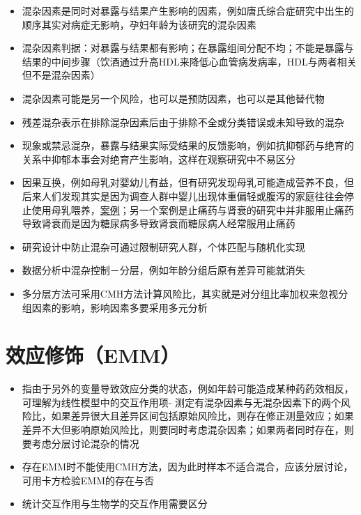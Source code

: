 \documentclass[]{book}
\providecommand{\tightlist}{%
  \setlength{\itemsep}{0pt}\setlength{\parskip}{0pt}}
\begin{document}
\begin{itemize}
\tightlist
\item
  混杂因素是同时对暴露与结果产生影响的因素，例如唐氏综合症研究中出生的顺序其实对病症无影响，孕妇年龄为该研究的混杂因素
\item
  混杂因素判据：对暴露与结果都有影响；在暴露组间分配不均；不能是暴露与结果的中间步骤（饮酒通过升高HDL来降低心血管病发病率，HDL与两者相关但不是混杂因素）
\item
  混杂因素可能是另一个风险，也可以是预防因素，也可以是其他替代物
\item
  残差混杂表示在排除混杂因素后由于排除不全或分类错误或未知导致的混杂
\item
  现象或禁忌混杂，暴露与结果实际受结果的反馈影响，例如抗抑郁药与绝育的关系中抑郁本事会对绝育产生影响，这样在观察研究中不易区分
\item
  因果互换，例如母乳对婴幼儿有益，但有研究发现母乳可能造成营养不良，但后来人们发现其实是因为调查人群中婴儿出现体重偏轻或腹泻的家庭往往会停止使用母乳喂养，\href{http://ije.oxfordjournals.org/content/26/2/349.full.pdf+html}{案例}；另一个案例是止痛药与肾衰的研究中并非服用止痛药导致肾衰而是因为糖尿病多导致肾衰而糖尿病人经常服用止痛药
\item
  研究设计中防止混杂可通过限制研究人群，个体匹配与随机化实现
\item
  数据分析中混杂控制－分层，例如年龄分组后原有差异可能就消失
\item
  多分层方法可采用CMH方法计算风险比，其实就是对分组比率加权来忽视分组因素的影响，影响因素多要采用多元分析
\end{itemize}

\hypertarget{ux6548ux5e94ux4feeux9970emm}{%
\section{效应修饰（EMM）}\label{ux6548ux5e94ux4feeux9970emm}}

\begin{itemize}
\tightlist
\item
  指由于另外的变量导致效应分类的状态，例如年龄可能造成某种药药效相反，可理解为线性模型中的交互作用项- 测定有混杂因素与无混杂因素下的两个风险比，如果差异很大且差异区间包括原始风险比，则存在修正测量效应；如果差异不大但影响原始风险比，则要同时考虑混杂因素；如果两者同时存在，则要考虑分层讨论混杂的情况
\item
  存在EMM时不能使用CMH方法，因为此时样本不适合混合，应该分层讨论，可用卡方检验EMM的存在与否
\item
  统计交互作用与生物学的交互作用需要区分
\end{itemize}
\end{document}

